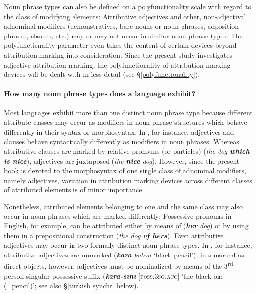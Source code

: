 Noun phrase types can also be defined on a polyfunctionality scale with regard to the class of modifying elements: Attributive adjectives and other, non-adjectival adnominal modifiers (demonstratives, bare nouns or noun phrases, adposition phrases, clauses, etc.) may or may not occur in similar noun phrase types. The polyfunctionality parameter even takes the content of certain devices beyond attribution marking into consideration. Since the present study investigates adjective attribution marking, the polyfunctionality of attribution marking devices will be dealt with in less detail (see \S\ref{polyfunctionality}). 

\paragraph*{How many noun phrase types does a language exhibit?} 
Most languages exhibit more than one distinct noun phrase type because different attribute classes may occur as modifiers in noun phrase structures which behave differently in their syntax or morphosyntax. In , for instance, adjectives and clauses behave syntactically differently as modifiers in noun phrases: Whereas attributive clauses are marked by relative pronouns (or particles) (\textit{the dog \textbf{which is nice}}), adjectives are juxtaposed (\textit{the \textbf{nice} dog}). However, since the present book is devoted to the morphosyntax of one single class of adnominal modifiers, namely adjectives, variation in attribution marking devices across different classes of attributed elements is of minor importance. 

Nonetheless, attributed elements belonging to one and the same class may also occur in noun phrases which are marked differently: Possessive pronouns in English, for example, can be attributed either by means of  (\textit{\textbf{her} dog}) or by using them in a prepositional construction (\textit{the dog \textbf{of hers}}). Even attributive adjectives may occur in two formally distinct noun phrase types. In , for instance, attributive adjectives are unmarked (\textit{\textbf{kara} kalem} ‘black pencil’); in s marked as direct objects, however, adjectives must be nominalized by means of the 3\textsuperscript{rd} person singular possessive suffix (\textit{\textbf{kara-sını}} [\textsc{poss:3sg.acc}] ‘the black one (=pencil)’; see also \S\ref{turkish synchr} below). 

